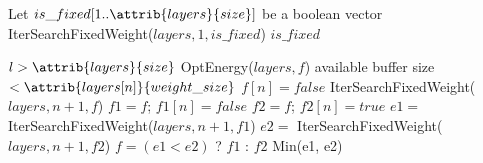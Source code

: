 \begin{codebox}
\li Let $is\_fixed[1 .. \attrib{layers}{size}]$ be a boolean vector
\li IterSearchFixedWeight($layers, 1, is\_fixed$)
\li \Return $is\_fixed$
\end{codebox}

\begin{codebox}
\li \If $l > \attrib{layers}{size}$
\li	\Do
     \Return OptEnergy($layers, f$)
  \End
\li \If available buffer size $< \attrib{layers[n]}{weight\_size}$
\li	\Do
     $f[n] = false$
\li 	\Return IterSearchFixedWeight($layers, n+1, f$)
  \End
\li $f1 = f$; $f1[n] = false$
\li $f2 = f$; $f2[n] = true$
\li $e1 =$ IterSearchFixedWeight($layers, n+1, f1$)
\li $e2 =$ IterSearchFixedWeight($layers, n+1, f2$)
\li $f = (e1 < e2)$ ? $f1$ : $f2$
\li \Return Min(e1, e2)
\end{codebox}